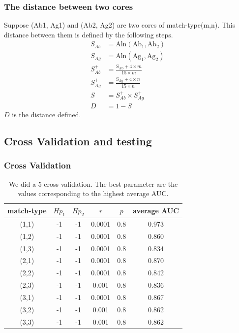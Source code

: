 \documentclass[hyperref={pdfpagelabels=false}]{beamer}
\begin{document}
\begin{frame}
\frametitle{The distance between two cores}
Suppose (Ab1, Ag1) and (Ab2, Ag2) are two cores of match-type(m,n). This distance between them is defined by the following steps.
	\begin{align*}
	S_{Ab} &= \mathrm{Aln}(\mathrm{Ab}_1, \mathrm{Ab}_2)\\
	S_{Ag} &= \mathrm{Aln}(\mathrm{Ag}_1, \mathrm{Ag}_2)\\
	S_{Ab}^{+} &= \frac{\mathrm{S_{Ab}} + 4\times m}{15 \times m}\\
	S_{Ag}^{+} &= \frac{\mathrm{S_{Ag}} + 4\times n}{15 \times n}\\
	S&=S_{Ab}^+ \times S_{Ag}^+\\
	D&= 1- S
	\end{align*}
$D$ is the distance defined.
\end{frame}

\subsection{Cross Validation and testing}
\begin{frame}
\frametitle{Cross Validation}
\begin{table}[H]\centering
\begin{tabular}{ccccc c}
\hline\hline
match-type   &  $Hp_1$     & $Hp_2$    & $r$   & $p$&average AUC\\
\hline
(1,1)  & -1  & -1 &0.0001&0.8&0.973\\
(1,2)  & -1  & -1 & 0.0001&0.8&0.860\\
(1,3)  & -1  & -1 &0.0001&0.8&0.834\\
(2,1)  & -1  & -1 &0.0001&0.8&0.870\\
(2,2)  & -1  & -1 &0.0001&0.8&0.842\\
(2,3)  & -1  & -1 &0.001&0.8&0.836\\
(3,1)  & -1  & -1 &0.0001&0.8&0.867\\
(3,2)  & -1  & -1 &0.001&0.8&0.862\\
(3,3)  & -1  & -1 &0.001&0.8&0.862\\
\hline
\end{tabular}
\caption{\small{We did a 5 cross validation. The best parameter are the values corresponding to the highest average AUC.}}
\label{Best_para_Binary}
\end{table}
\end{frame}
\end{document}
